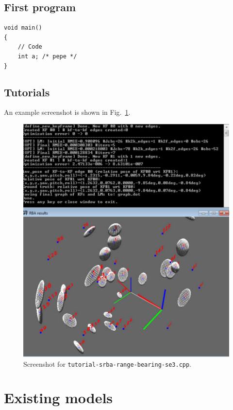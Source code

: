 \documentclass[a4paper,11pt]{article}
\begin{document}
\subsection{First program}

\begin{lstlisting}
void main()
{
	// Code 
    int a; /* pepe */
}
\end{lstlisting}

\subsection{Tutorials}

An example screenshot is shown in Fig.~\ref{fig:screenshot.tutorial1}.

\begin{figure}
\centering
\includegraphics[width=1.0\textwidth]{imgs/screenshot_tutorial_range-bearing-3D.pdf} 
\caption{Screenshot for \texttt{tutorial-srba-range-bearing-se3.cpp}.}
\label{fig:screenshot.tutorial1}
\end{figure}


\section{Existing models}
\label{sect:program_models}
\end{document}
